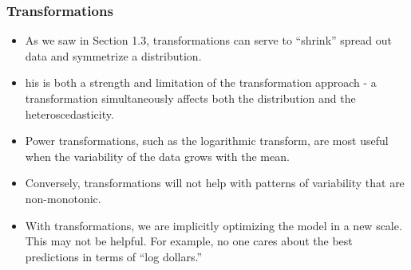 \begin{frame}%
 \frametitle{Transformations}
 \begin{itemize}
   \item As we saw in
Section 1.3, transformations can serve to ``shrink'' spread out data
and symmetrize a distribution.
\item his is both a
strength and limitation of the transformation approach - a
transformation simultaneously affects both the distribution and the
heteroscedasticity.
\item Power transformations, such as the logarithmic transform, are most
useful when the variability of the data grows with the mean.
\item Conversely, transformations
will not help with patterns of variability that are non-monotonic.
\item With transformations, we are implicitly optimizing the model
in a new scale. This may not be helpful. For example, no one cares
about the best predictions in terms of ``log dollars.''

    \end{itemize}
\end{frame}
